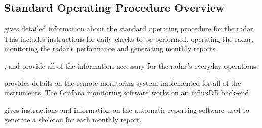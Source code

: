 \subsection{Standard Operating Procedure Overview}
\label{subsec:intro_ops}
 gives detailed information about the standard operating procedure for the radar. This includes instructions for daily checks to be performed, operating the radar, monitoring the radar's performance and generating monthly reports.
\par
{},  and  provide all of the information necessary for the radar's everyday operations.
\par
{} provides details on the remote monitoring system implemented for all of the instruments. The Grafana monitoring software works on an influxDB back-end.
\par
{} gives instructions and information on the automatic reporting software used to generate a skeleton for each monthly report.


\clearpage